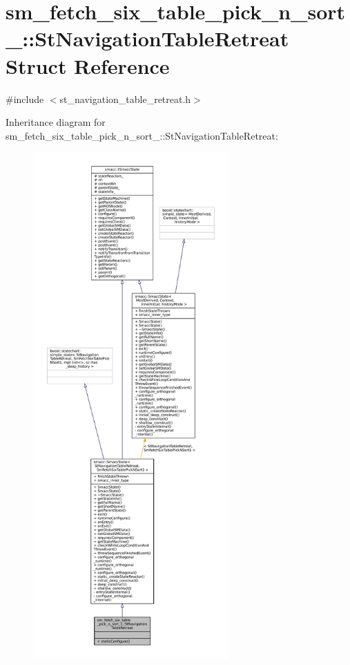 \hypertarget{structsm__fetch__six__table__pick__n__sort__1_1_1StNavigationTableRetreat}{}\section{sm\+\_\+fetch\+\_\+six\+\_\+table\+\_\+pick\+\_\+n\+\_\+sort\+\_\+:\+:St\+Navigation\+Table\+Retreat Struct Reference}
\label{structsm__fetch__six__table__pick__n__sort__1_1_1StNavigationTableRetreat}


{\ttfamily \#include $<$st\+\_\+navigation\+\_\+table\+\_\+retreat.\+h$>$}



Inheritance diagram for sm\+\_\+fetch\+\_\+six\+\_\+table\+\_\+pick\+\_\+n\+\_\+sort\+\_\+:\+:St\+Navigation\+Table\+Retreat\+:
\nopagebreak
\begin{figure}[H]
\begin{center}
\leavevmode
\includegraphics[height=550pt]{structsm__fetch__six__table__pick__n__sort__1_1_1StNavigationTableRetreat__inherit__graph}
\end{center}
\end{figure}


